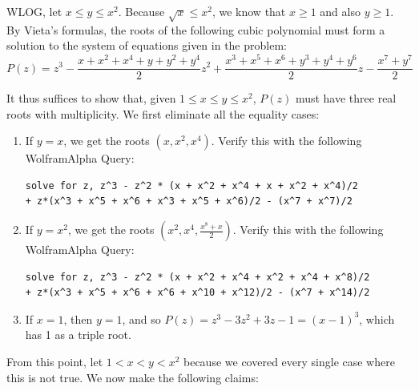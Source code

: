 \documentclass[10pt]{../usamts}
\begin{document}
\begin{solution}

WLOG, let $x \le y \le x^2$. Because $\sqrt{x} \le x^2$, we know that $x \ge 1$ and also $y \ge 1$. By Vieta's formulas, the roots of the following cubic polynomial must form a solution to the system of equations given in the problem:
\[
    P(z) = z^3 - \frac{x + x^2 + x^4 + y + y^2 + y^4}{2}z^2 + \frac{x^3 + x^5 + x^6 + y^3 + y^4 + y^6}{2}z - \frac{x^7 + y^7}{2}
\]

It thus suffices to show that, given $1 \le x \le y \le x^2$, $P(z)$ must have three real roots with multiplicity. We first eliminate all the equality cases:

\begin{enumerate}
\item If $y=x$, we get the roots $(x, x^2, x^4)$. Verify this with the following WolframAlpha Query:
\begin{verbatim}
solve for z, z^3 - z^2 * (x + x^2 + x^4 + x + x^2 + x^4)/2
+ z*(x^3 + x^5 + x^6 + x^3 + x^5 + x^6)/2 - (x^7 + x^7)/2
\end{verbatim}
    
\item If $y=x^2$, we get the roots $(x^2, x^4, \frac{x^8 + x}{2})$. Verify this with the following WolframAlpha Query:
\begin{verbatim}
solve for z, z^3 - z^2 * (x + x^2 + x^4 + x^2 + x^4 + x^8)/2
+ z*(x^3 + x^5 + x^6 + x^6 + x^10 + x^12)/2 - (x^7 + x^14)/2
\end{verbatim}

\item If $x=1$, then $y=1$, and so $P(z) = z^3 - 3z^2 + 3z - 1 = (x-1)^3$, which has 1 as a triple root.
\end{enumerate}

From this point, let $1 < x < y < x^2$ because we covered every single case where this is not true. We now make the following claims:


\end{solution}
\end{document}
